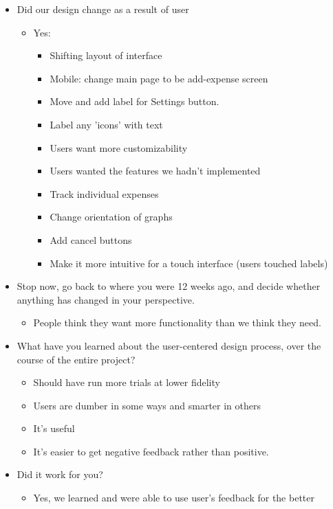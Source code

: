 \documentclass{chi2011}
\begin{document}
	\begin{itemize}[noitemsep]
		\item Did our design change as a result of user
		\begin{itemize}[noitemsep]
			\item Yes:
			\begin{itemize}[noitemsep]
				\item Shifting layout of interface
				\item Mobile: change main page to be add-expense screen
				\item Move and add label for Settings button.
				\item Label any 'icons' with text
				\item Users want more customizability
				\item Users wanted the features we hadn't implemented
				\item Track individual expenses
				\item Change orientation of graphs
				\item Add cancel buttons
				\item Make it more intuitive for a touch interface (users touched labels)
			\end{itemize}
		\end{itemize}

		\item Stop now, go back to where you were 12 weeks ago, and decide whether anything has changed in your perspective. 
		\begin{itemize}[noitemsep]
			\item People think they want more functionality than we think they need.
		\end{itemize}

		\item What have you learned about the user-centered design process, over the course of the entire project? 
		\begin{itemize}[noitemsep]
			\item Should have run more trials at lower fidelity
			\item Users are dumber in some ways and smarter in others
			\item It's useful
			\item It's easier to get negative feedback rather than positive.
		\end{itemize}

		\item Did it work for you? 
		\begin{itemize}[noitemsep]
			\item Yes, we learned and were able to use user's feedback for the better
		\end{itemize}


\end{itemize}
\end{document}
